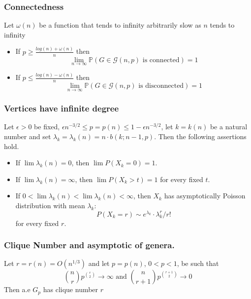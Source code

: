 \documentclass[handout]{beamer}
\theoremstyle{plain}
\renewcommand{\P}{\mathbb{P}}
\newcommand{\G}{\mathcal{G}}
\begin{document}
\begin{frame}
\frametitle{Connectedness}

\begin{theorem}
Let $\omega(n)$ be a function that tends to infinity arbitrarily slow as $n$ tends to infinity
\begin{itemize}
\item If $p\geq \frac{log(n)+ \omega(n)}{n}$ then 
$$\lim_{n \to \infty} \P(G \in \G(n,p) \text{ is connected}) = 1$$
\item If $p\leq \frac{log(n)- \omega(n)}{n}$ then
$$\lim_{n \to \infty} \P(G \in \G(n,p) \text{ is disconnected}) = 1$$
\end{itemize}
\end{theorem}

\end{frame}

\begin{frame}
\frametitle{Vertices have  infinite  degree}
\begin{theorem}
Let $\epsilon>0$ be fixed, $\epsilon n^{-3/2} \leq p = p(n) \leq 1 - \epsilon n^{-3/2}$, let $k = k(n)$ be a natural number and set $\lambda_{k} = \lambda_{k}(n) = n\cdot b(k;n - 1,p)$. Then the following assertions hold.

\begin{itemize}
\item If $\lim \lambda_{k}(n) = 0$, then $\lim P(X_{k} = 0) = 1$. 
\item If $\lim \lambda_{k}(n) = \infty$, then $\lim P(X_{k} > t) = 1$
for every fixed $t$.
\item If $0 < \lim\lambda_{k}(n) < \lim \lambda_{k}(n) < \infty$,
then $X_{k}$ has asymptotically Poisson distribution with mean $\lambda_{k}$: 
$$P(X_{k} = r) \sim e^{\lambda_{k}}\cdot \lambda_{k}^{r}/ r!$$
for every fixed $r$.
\end{itemize}
\end{theorem}
\end{frame}

\begin{frame}

\frametitle{Clique Number  and asymptotic  of  genera.}
\begin{theorem}
Let $r = r(n) = O(n^{1/3})$ and let $p=p(n)$, $0<p<1$, be such that
$$\binom{n}{r} p^{\binom{r}{2}} \to \infty \text{ and } \binom{n}{r+1} p^{\binom{r+1}{2}} \to 0 $$
Then a.e $G_{p}$ has clique number $r$
\end{theorem}
\end{frame}
\end{document}
